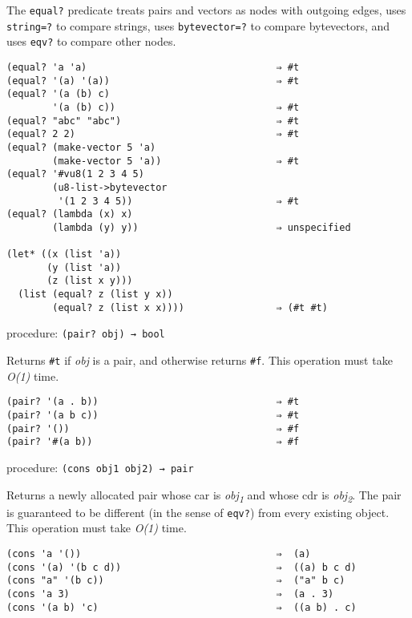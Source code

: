 The \texttt{equal?} predicate treats pairs and vectors as nodes with
outgoing edges, uses \texttt{string=?} to compare strings, uses
\texttt{bytevector=?} to compare bytevectors, and uses \texttt{eqv?} to
compare other nodes.

\begin{verbatim}
(equal? 'a 'a)                                 ⇒ #t
(equal? '(a) '(a))                             ⇒ #t
(equal? '(a (b) c)
        '(a (b) c))                            ⇒ #t
(equal? "abc" "abc")                           ⇒ #t
(equal? 2 2)                                   ⇒ #t
(equal? (make-vector 5 'a)
        (make-vector 5 'a))                    ⇒ #t
(equal? '#vu8(1 2 3 4 5)
        (u8-list->bytevector
         '(1 2 3 4 5))                         ⇒ #t
(equal? (lambda (x) x)
        (lambda (y) y))                        ⇒ unspecified

(let* ((x (list 'a))
       (y (list 'a))
       (z (list x y)))
  (list (equal? z (list y x))
        (equal? z (list x x))))                ⇒ (#t #t)
\end{verbatim}

procedure: \texttt{(pair?\ obj)\ →\ bool}

Returns \texttt{\#t} if \emph{obj} is a pair, and otherwise returns
\texttt{\#f}. This operation must take \emph{O(1)} time.

\begin{verbatim}
(pair? '(a . b))                               ⇒ #t
(pair? '(a b c))                               ⇒ #t
(pair? '())                                    ⇒ #f
(pair? '#(a b))                                ⇒ #f
\end{verbatim}

procedure: \texttt{(cons\ obj1\ obj2)\ →\ pair}

Returns a newly allocated pair whose car is \emph{obj\textsubscript{1}}
and whose cdr is \emph{obj\textsubscript{2}}. The pair is guaranteed to
be different (in the sense of \texttt{eqv?}) from every existing object.
This operation must take \emph{O(1)} time.

\begin{verbatim}
(cons 'a '())                                  ⇒  (a)
(cons '(a) '(b c d))                           ⇒  ((a) b c d)
(cons "a" '(b c))                              ⇒  ("a" b c)
(cons 'a 3)                                    ⇒  (a . 3)
(cons '(a b) 'c)                               ⇒  ((a b) . c)
\end{verbatim}

